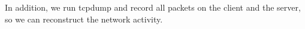 \documentclass[10pt,sigconf]{acmart}
\begin{document}
In addition, we run tcpdump and record all packets on the client and the server, so we can reconstruct the network activity.





\end{document}
